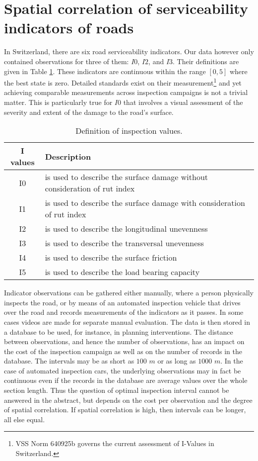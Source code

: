 \documentclass[Journal]{ascelike}
\begin{document}
\section{Spatial correlation of serviceability indicators of roads} \label{spatialcorrelation}
In Switzerland, there are six road serviceability indicators. Our data however only contained observations for three 
of them: $I0$, $I2$, and $I3$. Their definitions are given in Table \ref{table1}. These indicators are continuous 
within the range $[0,5]$ where the best state is zero. Detailed standards exist on their measurement\footnote{VSS Norm 640925b governs the current assessment of I-Values in Switzerland.} and yet achieving comparable measurements across inspection campaigns is not a trivial matter. This is particularly true for $I0$ that 
involves a visual assessment of the severity and extent of the damage to the road’s surface. 
\begin{table}
\begin{center}
\caption{Definition of inspection values.}
\label{table1}
\begin{tabular}{c|l}\hline
\textbf{I values} & \textbf{Description}\\\hline
I0 & is used to describe the surface damage without consideration of rut index\\
I1 & is used to describe the surface damage with consideration of rut index\\
I2 & is used to describe the longitudinal unevenness\\
I3 & is used to describe the transversal unevenness\\
I4 & is used to describe the surface friction\\
I5 & is used to describe the load bearing capacity\\\hline
\end{tabular}
\end{center}
\end{table}

Indicator observations can be gathered either manually, where a person physically inspects the road, or by means of an 
automated inspection vehicle that drives over the road and records measurements of the indicators as it passes. In some 
cases videos are made for separate manual evaluation. The data is then stored in a database to be used, for instance, in 
planning interventions. The distance between observations, and hence the number of observations, has an impact on the 
cost of the inspection campaign as well as on the number of records in the database. The intervals may be as short as 
$100$ $m$ or as long as $1000$ $m$. In the case of automated inspection cars, the underlying observations may in fact be continuous even if the records in the database are average values over the whole section length. Thus the question of optimal inspection interval cannot be answered in the abstract, but depends on the cost per observation and the degree of spatial correlation. If spatial correlation is high, then intervals can be longer, all else equal.
\end{document}
